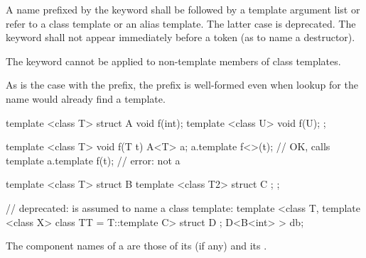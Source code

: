 \pnum
A name prefixed by the keyword
shall be followed by a template argument list or
refer to a class template or an alias template.
The latter case is deprecated.
The keyword  shall not appear immediately
before a \tcode{\~} token (as to name a destructor).
\begin{note}
The keyword
cannot be applied to non-template members of class templates.
\end{note}
\begin{note}
As is the case with the
prefix, the
prefix is well-formed
even when lookup for the name would already find a template.
\end{note}
\begin{example}
\begin{codeblock}
template <class T> struct A {
  void f(int);
  template <class U> void f(U);
};

template <class T> void f(T t) {
  A<T> a;
  a.template f<>(t);                    // OK, calls template
  a.template f(t);                      // error: not a 
}

template <class T> struct B {
  template <class T2> struct C { };
};

// deprecated:  is assumed to name a class template:
template <class T, template <class X> class TT = T::template C> struct D { };
D<B<int> > db;
\end{codeblock}
\end{example}

\pnum
The component names of a  are
those of its  (if any) and
its .

